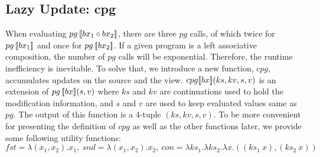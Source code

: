 \subsection{Lazy Update: cpg} 

When evaluating $pg \, [\![bx_1 \circ bx_2]\!]$, there are three $pg$ calls, of which twice for $pg \, [\![bx_1]\!]$ and once for $pg \, [\![bx_2]\!]$. If a given program is a left associative composition, the number of $pg$ calls will be exponential. Therefore, the runtime inefficiency is inevitable. To solve that, we introduce a new function, $cpg$, accumulates updates on the source and the view. $cpg [\![bx]\!] (ks, kv, s, v)$ is an extension of $pg \, [\![bx]\!] (s, v)$ where $ks$ and $kv$ are continuations used to hold the modification information, and $s$ and $v$ are used to keep evaluated values same as $pg$. The output of this function is a 4-tuple $(ks, kv, s, v)$. To be more convenient for presenting the definition of $cpg$ as well as the other functions later, we provide some following utility functions:\\ $fst = \lambda (x_1,x_2). x_1 , \ snd = \lambda (x_1,x_2). x_2 , \ con = \lambda ks_1. \lambda ks_2. \lambda x. ((ks_1 \ x),(ks_2 \ x))$

